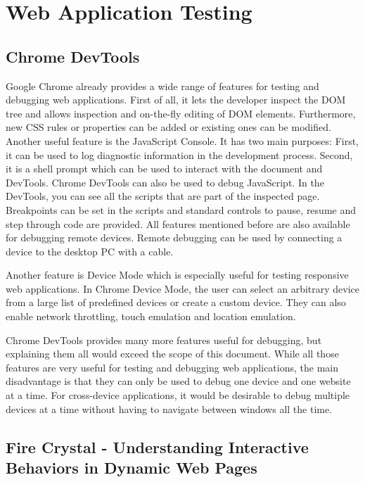 \section{Web Application Testing}

\subsection{Chrome DevTools}

Google Chrome already provides a wide range of features for testing and debugging web applications. First of all, it lets the developer inspect the DOM tree  and allows inspection and on-the-fly editing of DOM elements. Furthermore, new CSS rules or properties can be added or existing ones can be modified. Another useful feature is the JavaScript Console. It has two main purposes: First, it can be used to log diagnostic information in the development process. Second, it is a shell prompt which can be used to interact with the document and DevTools. Chrome DevTools can also be used to debug JavaScript. In the DevTools, you can see all the scripts that are part of the inspected page. Breakpoints can be set in the scripts and standard controls to pause, resume and step through code are provided. All features mentioned before are also available for debugging remote devices. Remote debugging can be used by connecting a device to the desktop PC with a cable.

Another feature is Device Mode which is especially useful for testing responsive web applications. In Chrome Device Mode, the user can select an arbitrary device from a large list of predefined devices or create a custom device. They can also enable network throttling, touch emulation and location emulation. 

Chrome DevTools provides many more features useful for debugging, but explaining them all would exceed the scope of this document. While all those features are very useful for testing and debugging web applications, the main disadvantage is that they can only be used to debug one device and one website at a time. For cross-device applications, it would be desirable to debug multiple devices at a time without having to navigate between windows all the time.

\subsection{Fire Crystal - Understanding Interactive Behaviors in Dynamic Web Pages}

